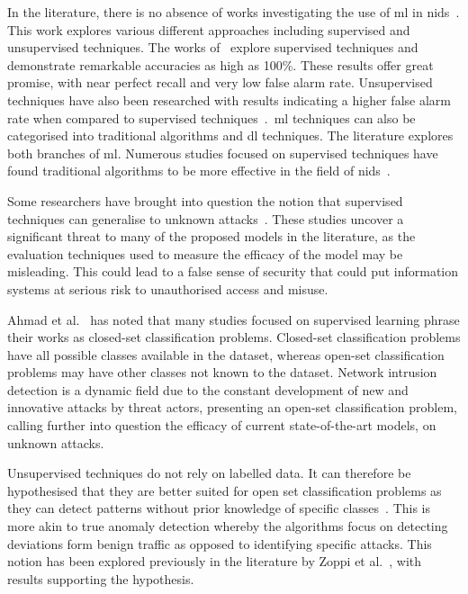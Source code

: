 In the literature, there is no absence of works investigating the use of
\gls{ml} in \gls{nids}~\cite{Karatas, Jiang, Mighan, Pu, Cao, Atefinia}. This
work explores various different approaches including supervised and
unsupervised techniques. The works of~\cite{Karatas, Jiang, Mighan, Atefinia}
explore supervised techniques and demonstrate remarkable accuracies as high as
100\%. These results offer great promise, with near perfect recall and very low
false alarm rate. Unsupervised techniques have also been researched with
results indicating a higher false alarm rate when compared to supervised
techniques~\cite{Zoppi}.\ \gls{ml} techniques can also be categorised into
traditional algorithms and \gls{dl} techniques. The literature explores both
branches of \gls{ml}. Numerous studies focused on supervised techniques have
found traditional algorithms to be more effective in the field of
\gls{nids}~\cite{Liu, Zoppi}.

Some researchers have brought into question the notion that supervised
techniques can generalise to unknown attacks~\cite{Kus, Zoppi}. These studies
uncover a significant threat to many of the proposed models in the literature,
as the evaluation techniques used to measure the efficacy of the model may be
misleading. This could lead to a false sense of security that could put
information systems at serious risk to unauthorised access and misuse.

Ahmad et al.~\cite{zero-day} has noted that many studies focused on supervised
learning phrase their works as closed-set classification problems. Closed-set
classification problems have all possible classes available in the dataset,
whereas open-set classification problems may have other classes not known to
the dataset. Network intrusion detection is a dynamic field due to the constant
development of new and innovative attacks by threat actors, presenting an
open-set classification problem, calling further into question the efficacy of
current state-of-the-art models, on unknown attacks.

Unsupervised techniques do not rely on labelled data. It can therefore be
hypothesised that they are better suited for open set classification problems
as they can detect patterns without prior knowledge of specific
classes~\cite{unsupervised_ml}. This is more akin to true anomaly detection
whereby the algorithms focus on detecting deviations form benign traffic as
opposed to identifying specific attacks. This notion has been explored
previously in the literature by Zoppi et al.~\cite{Zoppi}, with results
supporting the hypothesis.

